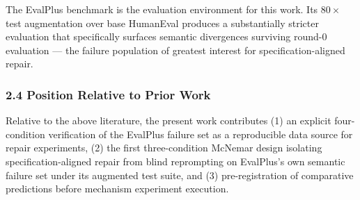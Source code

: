 The EvalPlus benchmark \citep{Liu2023EvalPlus} is the evaluation environment for this work. Its $80\times$ test augmentation over base HumanEval produces a substantially stricter evaluation that specifically surfaces semantic divergences surviving round-0 evaluation --- the failure population of greatest interest for specification-aligned repair.

\subsubsection{2.4 Position Relative to Prior Work}

Relative to the above literature, the present work contributes (1) an explicit four-condition verification of the EvalPlus failure set as a reproducible data source for repair experiments, (2) the first three-condition McNemar design isolating specification-aligned repair from blind reprompting on EvalPlus's own semantic failure set under its augmented test suite, and (3) pre-registration of comparative predictions before mechanism experiment execution.

